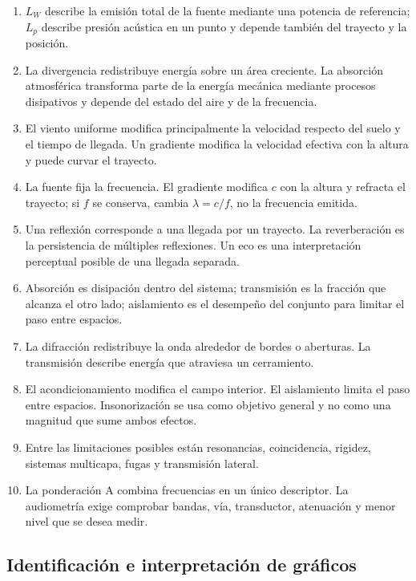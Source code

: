 \begin{enumerate}[label=\textbf{C\arabic*.},leftmargin=*]
    \item \(L_W\) describe la emisión total de la fuente mediante una potencia
    de referencia; \(L_p\) describe presión acústica en un punto y depende
    también del trayecto y la posición.
    \item La divergencia redistribuye energía sobre un área creciente. La
    absorción atmosférica transforma parte de la energía mecánica mediante
    procesos disipativos y depende del estado del aire y de la frecuencia.
    \item El viento uniforme modifica principalmente la velocidad respecto del
    suelo y el tiempo de llegada. Un gradiente modifica la velocidad efectiva
    con la altura y puede curvar el trayecto.
    \item La fuente fija la frecuencia. El gradiente modifica \(c\) con la
    altura y refracta el trayecto; si \(f\) se conserva, cambia
    \(\lambda=c/f\), no la frecuencia emitida.
    \item Una reflexión corresponde a una llegada por un trayecto. La
    reverberación es la persistencia de múltiples reflexiones. Un eco es una
    interpretación perceptual posible de una llegada separada.
    \item Absorción es disipación dentro del sistema; transmisión es la fracción
    que alcanza el otro lado; aislamiento es el desempeño del conjunto para
    limitar el paso entre espacios.
    \item La difracción redistribuye la onda alrededor de bordes o aberturas.
    La transmisión describe energía que atraviesa un cerramiento.
    \item El acondicionamiento modifica el campo interior. El aislamiento limita
    el paso entre espacios. Insonorización se usa como objetivo general y no
    como una magnitud que sume ambos efectos.
    \item Entre las limitaciones posibles están resonancias, coincidencia,
    rigidez, sistemas multicapa, fugas y transmisión lateral.
    \item La ponderación A combina frecuencias en un único descriptor. La
    audiometría exige comprobar bandas, vía, transductor, atenuación y menor
    nivel que se desea medir.
\end{enumerate}

\subsection*{Identificación e interpretación de gráficos}

